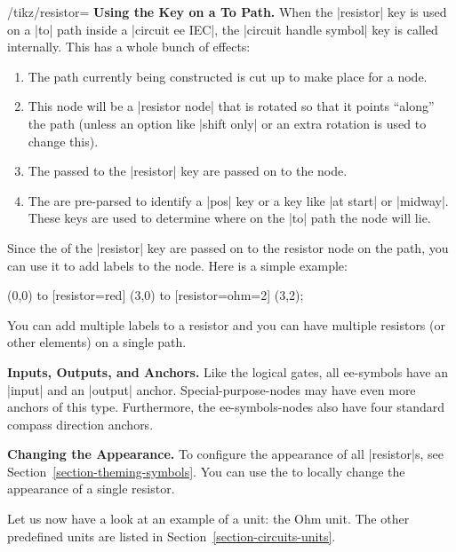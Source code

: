 \begin{key}{/tikz/resistor=}
    \medskip\textbf{Using the Key on a To Path.}
    When the |resistor| key is used on a |to| path inside a |circuit ee IEC|,
    the |circuit handle symbol| key is called internally. This has a whole
    bunch of effects:
    \begin{enumerate}
        \item The path currently being constructed is cut up to make place for
            a node.
        \item This node will be a |resistor node| that is rotated so that it
            points ``along'' the path (unless an option like |shift only| or an
            extra rotation is used to change this).
        \item The  passed to the |resistor| key are passed on to
            the node.
        \item The  are pre-parsed to identify a |pos| key or a
            key like |at start| or |midway|. These keys are used to determine
            where on the |to| path the node will lie.
    \end{enumerate}

    Since the  of the |resistor| key are passed on to the
    resistor node on the path, you can use it to add labels to the node. Here
    is a simple example:
\begin{codeexample}[preamble={\usetikzlibrary{circuits.ee.IEC}}]
  \draw (0,0) to [resistor=red]        (3,0)
              to [resistor={ohm=2\mu}] (3,2);
\end{codeexample}

    You can add multiple labels to a resistor and you can have multiple
    resistors (or other elements) on a single path.

    \medskip\textbf{Inputs, Outputs, and Anchors.}
    Like the logical gates, all ee-symbols have an |input| and an |output|
    anchor. Special-purpose-nodes may have even more anchors of this type.
    Furthermore, the ee-symbols-nodes also have four standard compass direction
    anchors.

    \medskip\textbf{Changing the Appearance.}
    To configure the appearance of all |resistor|s, see
    Section~\ref{section-theming-symbols}. You can use the  to
    locally change the appearance of a single resistor.
\end{key}

Let us now have a look at an example of a unit: the Ohm unit. The other
predefined units are listed in Section~\ref{section-circuits-units}.

